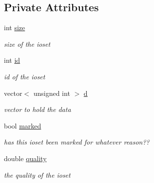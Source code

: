 \subsection*{Private Attributes}
\begin{DoxyCompactItemize}
\item 
\hypertarget{class_i_o_set_ae8acaf98753ad5fc405e7734988e371e}{
int \hyperlink{class_i_o_set_ae8acaf98753ad5fc405e7734988e371e}{size}}
\label{class_i_o_set_ae8acaf98753ad5fc405e7734988e371e}

\begin{DoxyCompactList}\small\item\em size of the ioset \item\end{DoxyCompactList}\item 
\hypertarget{class_i_o_set_aec085771a7d9c730275ab9cf08e3feed}{
int \hyperlink{class_i_o_set_aec085771a7d9c730275ab9cf08e3feed}{id}}
\label{class_i_o_set_aec085771a7d9c730275ab9cf08e3feed}

\begin{DoxyCompactList}\small\item\em id of the ioset \item\end{DoxyCompactList}\item 
\hypertarget{class_i_o_set_a606a04e94980958d24457389170fd92a}{
vector$<$ unsigned int $>$ \hyperlink{class_i_o_set_a606a04e94980958d24457389170fd92a}{d}}
\label{class_i_o_set_a606a04e94980958d24457389170fd92a}

\begin{DoxyCompactList}\small\item\em vector to hold the data \item\end{DoxyCompactList}\item 
\hypertarget{class_i_o_set_a3fad9f242ab3609cb303f12482fcc772}{
bool \hyperlink{class_i_o_set_a3fad9f242ab3609cb303f12482fcc772}{marked}}
\label{class_i_o_set_a3fad9f242ab3609cb303f12482fcc772}

\begin{DoxyCompactList}\small\item\em has this ioset been marked for whatever reason?? \item\end{DoxyCompactList}\item 
\hypertarget{class_i_o_set_a6321260797f9825e7b17bfcf26abd43e}{
double \hyperlink{class_i_o_set_a6321260797f9825e7b17bfcf26abd43e}{quality}}
\label{class_i_o_set_a6321260797f9825e7b17bfcf26abd43e}

\begin{DoxyCompactList}\small\item\em the quality of the ioset \item\end{DoxyCompactList}\end{DoxyCompactItemize}



